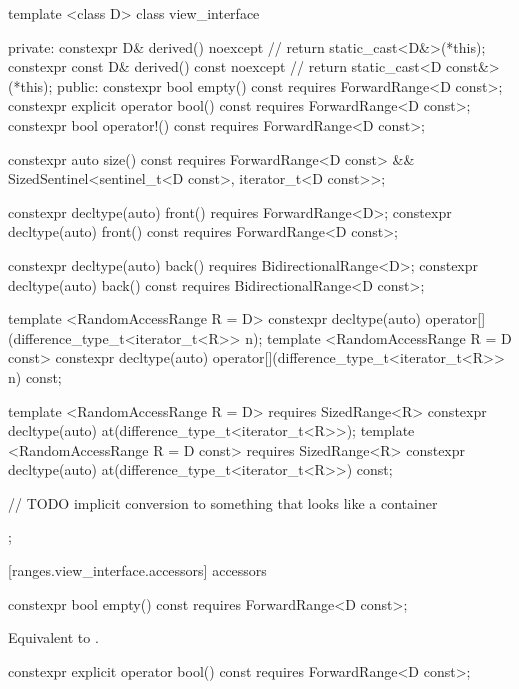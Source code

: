 %
\begin{codeblock}
template <class D>
class view_interface {
private:
  constexpr D& derived() noexcept { // \expos
    return static_cast<D&>(*this);
  }
  constexpr const D& derived() const noexcept { // \expos
    return static_cast<D const&>(*this);
  }
public:
  constexpr bool empty() const requires ForwardRange<D const>;
  constexpr explicit operator bool() const requires ForwardRange<D const>;
  constexpr bool operator!() const requires ForwardRange<D const>;

  constexpr auto size() const requires ForwardRange<D const> &&
    SizedSentinel<sentinel_t<D const>, iterator_t<D const>>;

  constexpr decltype(auto) front() requires ForwardRange<D>;
  constexpr decltype(auto) front() const requires ForwardRange<D const>;

  constexpr decltype(auto) back() requires BidirectionalRange<D>;
  constexpr decltype(auto) back() const requires BidirectionalRange<D const>;

  template <RandomAccessRange R = D>
    constexpr decltype(auto) operator[](difference_type_t<iterator_t<R>> n);
  template <RandomAccessRange R = D const>
    constexpr decltype(auto) operator[](difference_type_t<iterator_t<R>> n) const;

  template <RandomAccessRange R = D>
      requires SizedRange<R>
    constexpr decltype(auto) at(difference_type_t<iterator_t<R>>);
  template <RandomAccessRange R = D const>
      requires SizedRange<R>
    constexpr decltype(auto) at(difference_type_t<iterator_t<R>>) const;

  // TODO implicit conversion to something that looks like a container
};
\end{codeblock}

[ranges.view_interface.accessors]{ accessors}

%
\begin{itemdecl}
constexpr bool empty() const requires ForwardRange<D const>;
\end{itemdecl}

\begin{itemdescr}
\pnum
\returns Equivalent to .
\end{itemdescr}

%
\begin{itemdecl}
constexpr explicit operator bool() const requires ForwardRange<D const>;
\end{itemdecl}

